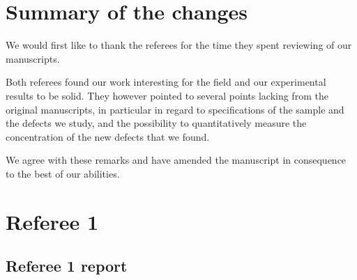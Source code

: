 \documentclass{article}
\begin{document}
\section*{Summary of the changes}

We would first like to thank the referees for the time they spent reviewing of our manuscripts.

Both referees found our work interesting for the field and our experimental results to be solid. They however pointed to several points lacking from the original manuscripts, in particular in regard to specifications of the sample and the defects we study, and the possibility to quantitatively measure the concentration of the new defects that we found.

We agree with these remarks and have amended the manuscript in consequence to the best of our abilities.

\section*{Referee 1}
\subsection*{Referee 1 report}
\end{document}
